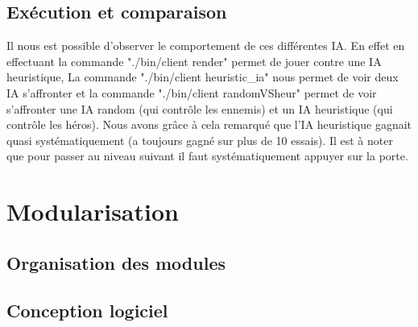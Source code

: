 \documentclass[a4paper,12pt]{article}
\begin{document}
\subsection{Exécution et comparaison}
Il nous est possible d'observer le comportement de ces différentes IA. En effet en effectuant la commande "./bin/client render" permet de jouer contre une IA heuristique, La commande "./bin/client heuristic\_ia" nous permet de voir deux IA s'affronter et la commande "./bin/client randomVSheur" permet de voir s'affronter une IA random (qui contrôle les ennemis) et un IA heuristique (qui contrôle les héros). Nous avons grâce à cela remarqué que l'IA heuristique gagnait quasi systématiquement (a toujours gagné sur plus de 10 essais). Il est à noter que pour passer au niveau suivant il faut systématiquement appuyer sur la porte.


\clearpage
\section{Modularisation}
\label{sec:module}

\subsection{Organisation des modules}


\subsection{Conception logiciel}


%
\end{document}
